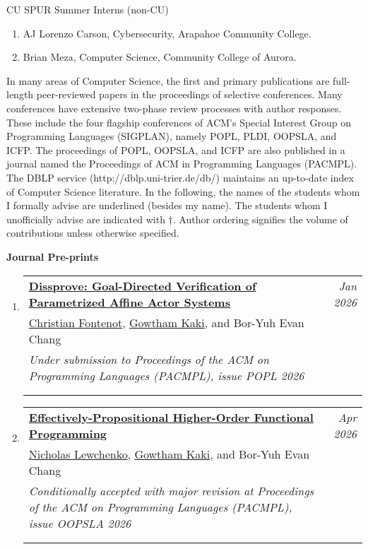 \documentclass{article}
\makeatletter
\newenvironment{benumerate}[2]{
    \let\oldItem\item
    \def\item{\addtocounter{enumi}{-2}\oldItem}
    \begin{enumerate}[#2] \itemsep3pt
    \setcounter{enumi}{#1}
    \addtocounter{enumi}{1}}
  {\end{enumerate}}
\newenvironment{region}[3]{%
  {{\textbf{#1}}}
  \begin{benumerate}{#3}{\color{RoyalBlue}#2}}
  {\end{benumerate}\vspace{0.8ex}}
\newenvironment{publication}[6]
{ \item
  \begin{tabular*}{6.8in}{p{6in}@{\extracolsep{\fill}}r}
    \href{#1}{\textbf{#2}} & \textit{#3}\\ #4 &\\ \textit{#5}&\\
    \ifthenelse{\equal{#6}{}}{}{#6&\\}
  \end{tabular*}
} {}
\makeatother
\begin{document}
\noindent CU SPUR Summer Interns (non-CU)
\begin{enumerate}
  \item AJ Lorenzo Carson, Cybersecurity, Arapahoe Community College.
  \item Brian Meza, Computer Science, Community College of Aurora.
\end{enumerate}


\vspace{1em}
In many areas of Computer Science, the first and primary publications are
full-length peer-reviewed papers in the proceedings of selective
conferences. Many conferences have extensive two-phase review processes
with author responses. These include the four flagship conferences of ACM's
Special Interest Group on Programming Languages (SIGPLAN), namely POPL,
PLDI, OOPSLA, and ICFP. The proceedings of POPL, OOPSLA, and ICFP are also
published in a journal named the Proceedings of ACM in Programming
Languages (PACMPL). The DBLP service (http://dblp.uni-trier.de/db/)
maintains an up-to-date index of Computer Science literature. In the
following, the names of the students whom I formally advise are underlined
(besides my name). The students whom I unofficially advise are indicated
with $\dag$. Author ordering signifies the volume of contributions unless
otherwise specified. 


\newcommand{\ugkaki}{\underline{Gowtham Kaki}}
\newcommand{\bec}{Bor-Yuh Evan Chang}
\newcommand{\sj}{Suresh Jagannathan}

\vspace{1em}
\begin{region} {Journal Pre-prints}{{J}1}{9}

\begin{publication}{}
		{Dissprove: Goal-Directed Verification of Parametrized Affine Actor Systems}
    {Jan 2026}{\underline{Christian Fontenot}, \ugkaki, and \bec}
    {Under submission to Proceedings of the ACM on Programming Languages
    (PACMPL), issue POPL 2026}{Full paper (25 pages)}
\end{publication}

\begin{publication}{}
		{Effectively-Propositional Higher-Order Functional Programming}
    {Apr 2026}{\underline{Nicholas Lewchenko}, \ugkaki, and \bec}
    {Conditionally accepted with major revision at Proceedings of the ACM
    on Programming Languages (PACMPL), issue OOPSLA 2026}{Full paper (25 pages)}
\end{publication}

\end{region}
\end{document}
